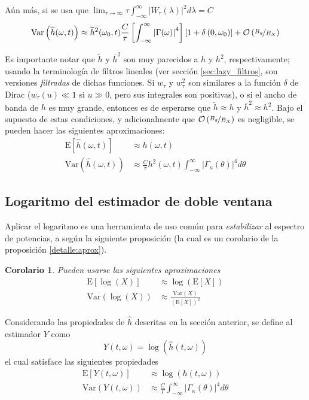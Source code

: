 \documentclass[12pt,letterpaper]{book}
\newtheorem{corolario}[teorema]{Corolario}
\newcommand{\intR}{\int_{-\infty}^{\infty}}
\newcommand{\est}[1]{\widehat{ #1 }}
\newcommand{\E}[1]{\mathrm{E}\left[ #1 \right]}
\newcommand{\Var}[1]{\mathrm{Var}\left( #1 \right)}
\newcommand{\abso}[1]{\left| #1 \right|}
\newcommand{\orden}[1]{\mathcal{O}\left( #1 \right)}
\begin{document}
Aún más, si se usa que $\lim_{\tau\rightarrow\infty} \tau \intR \abso{ W_{\tau}(\lambda) }^{2} d\lambda = C$
\begin{equation}
\Var{\widehat{h}(\omega,t)} \approx 
\widetilde{h}^{2}(\omega_0,t) \frac{C}{\tau} \left[ \intR \abso{\Gamma(\omega)}^{4} \right] \left[1+\delta\left(0,\omega_0\right)\right] + \orden{\nicefrac{B_g}{B_X}}
\end{equation}

Es importante notar que $\widetilde{h}$ y $\overline{h}^{2}$ son muy parecidos a $h$ y $h^2$, respectivamente; usando la terminología de filtros lineales (ver sección \ref{sec:lazy_filtros}, son versiones \textit{filtradas} de dichas funciones.
%
Si $w_\tau$ y $w_\tau^2$ son similares a la función $\delta$ de Dirac ($w_\tau(u) \ll 1$ si $u \gg 0$, pero sus integrales son positivas), o si el ancho de banda de $h$ es muy grande, entonces es de esperarse que $\widetilde{h}\approx h$ y $\overline{h}^{2}\approx h^{2}$.
%
Bajo el supuesto de estas condiciones, y adicionalmente que $\orden{\nicefrac{B_g}{B_X}}$ es negligible, se pueden hacer las siguientes aproximaciones:
\begin{align}
\E{\est{h}(\omega,t)} &\approx h(\omega,t) \\
\Var{\est{h}(\omega,t)} &\approx 
\frac{C}{\tau} h^{2}(\omega,t) \intR \abso{\Gamma_\kappa (\theta)}^{4} d\theta
\end{align}

\subsection{Logaritmo del estimador de doble ventana}

Aplicar el logaritmo es una herramienta de uso común para \textit{estabilizar} al espectro de potencias, a según la siguiente proposición (la cual es un corolario de la proposición \ref{detalle:aprox}).

\begin{corolario}
Pueden usarse las siguientes aproximaciones
\begin{align}
\E{\log(X)} &\approx \log\left( \E{X} \right) \\
\Var{\log(X)} &\approx \frac{\Var{X}}{\left( \E{X} \right)^{2}}
\end{align}
\end{corolario}

Considerando las propiedades de $\widehat{h}$ descritas en la sección anterior, se define al estimador $Y$ como
\begin{equation}
Y(t,\omega) = \log\left(\widehat{h}(t,\omega)\right)
\end{equation}
el cual satisface las siguientes propiedades
\begin{align}
\E{Y(t,\omega)} &\approx \log\left(h(t,\omega)\right) \\
\Var{Y(t,\omega)} &\approx \frac{C}{T} \intR \abso{\Gamma_\kappa(\theta)}^{4} d\theta
\end{align}
\end{document}
